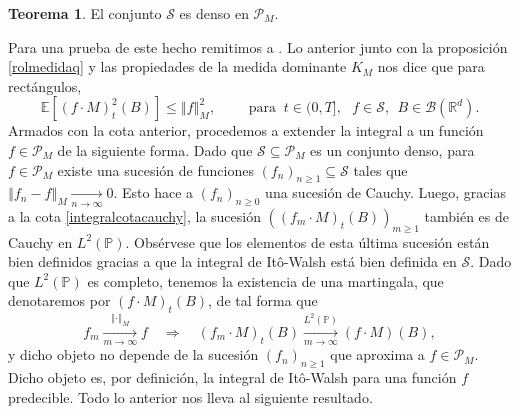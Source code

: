 \documentclass[letterpaper,twoside,12pt]{book}
\newcommand{\R}{\mathbb{R}}
\newcommand{\B}{\mathcal{B}}
\newcommand{\E}{\mathbb{E}}
\renewcommand{\P}{\mathbb{P}}
\newcommand{\1}{\mathds{1}}
\renewcommand{\to}{\rightarrow}
\newcommand{\ent}{\Longrightarrow}
\newcommand{\norm}[1]{\left\Vert #1 \right\Vert}
\theoremstyle{definition}
\theoremstyle{definition}
\newtheorem{teo}{Teorema}
\theoremstyle{remark}
\theoremstyle{definition}
\theoremstyle{definition}
\theoremstyle{definition}
\theoremstyle{definition}
\theoremstyle{definition}
\begin{document}
\begin{teo} 
El conjunto $\mathscr{S}$ es denso en $\mathscr{P}_M$.
\end{teo}
Para una prueba de este hecho remitimos a \cite[proposición 2.3]{Walsh_J.B_Introduction_to_SPDEs}. Lo anterior junto con la proposición \ref{rolmedidaq} y las propiedades de la medida dominante $K_M$ nos dice que para rectángulos,
\begin{equation}\label{integralcotacauchy}
   \E\left[(f\cdot M)_t^{2}(B)\right]\leq \norm{f}_M^2,\qquad \text{ para } \ t\in (0,T], \ \ \ f\in \mathscr{S}, \ \ B\in \B(\R^d).
\end{equation}
Armados con la cota anterior, procedemos a extender la integral a un función $f\in \mathscr{P}_M$ de la siguiente forma. Dado que $\mathscr{S}\subseteq \mathscr{P}_M$ es un conjunto denso, para $f\in \mathscr{P}_M$ existe una sucesión de funciones $(f_n)_{n\geq1}\subseteq \mathscr{S}$ tales que $\norm{f_n-f}_{M}\xrightarrow[n\to\infty]{}0$. Esto hace a $(f_n)_{n\geq0}$ una sucesión de Cauchy. Luego, gracias a la cota \eqref{integralcotacauchy}, la sucesión $\left((f_m\cdot M)_t(B)\right)_{m\geq1}$ también es de Cauchy en $L^{2}(\P)$. Obsérvese que los elementos de esta última sucesión están bien definidos gracias a que la integral de Itô-Walsh está bien definida en $\mathscr{S}$. Dado que $L^{2}(\P)$ es completo, tenemos la existencia de una martingala, que denotaremos por $(f\cdot M)_t(B)$, de tal forma que 
\[
f_m\xrightarrow[m\to\infty]{\norm{\cdot}_M}f \quad \ent \quad (f_m\cdot M)_t(B) \xrightarrow[m\to\infty]{L^{2}(\P)} (f\cdot M)(B),  
\]
y dicho objeto no depende de la sucesión $(f_n)_{n\geq1}$ que aproxima a $f\in \mathscr{P}_M$. Dicho objeto es, por definición, la integral de Itô-Walsh para una función $f$ predecible. Todo lo anterior nos lleva al siguiente resultado.
\end{document}
